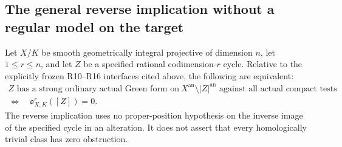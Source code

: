 \subsection{The general reverse implication without a regular model on the target}

\begin{theorem}
\label{r17vt:general-converse}
Let $X/K$ be smooth geometrically integral projective of dimension $n$,
let $1\le r\le n$, and let $Z$ be a specified rational
codimension-$r$ cycle. Relative to the explicitly frozen
R10--R16 interfaces cited above, the following are equivalent:
\[
 \boxed{
 \begin{gathered}
 \text{$Z$ has a strong ordinary actual Green form on}
       \ X^{\mathrm{an}}\setminus|Z|^{\mathrm{an}}
       \text{ against all actual compact tests}
 \\
 \Longleftrightarrow\quad
                   \mathfrak o_{X,K}^r([Z])=0.
 \end{gathered}}
 \tag{VT17.5}\label{r17vt:equivalence}
\]
The reverse implication uses no proper-position hypothesis
on the inverse image of the specified cycle in an alteration.
It does not assert that every homologically trivial class
has zero obstruction.
\end{theorem}

